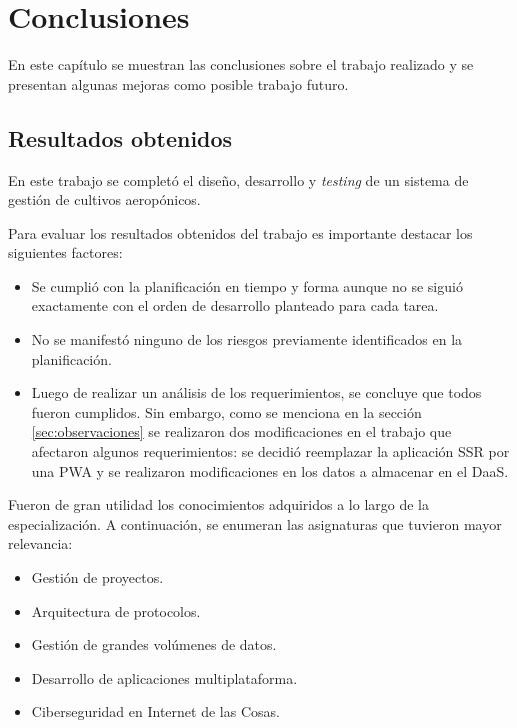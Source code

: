 
\chapter{Conclusiones} %

\label{Chapter5} %

En este capítulo se muestran las conclusiones sobre el trabajo realizado y se presentan algunas mejoras como posible trabajo futuro.



\section{Resultados obtenidos}

En este trabajo se completó el diseño, desarrollo y \textit{testing} de un sistema de gestión de cultivos aeropónicos.

Para evaluar los resultados obtenidos del trabajo es importante destacar los siguientes factores:
\begin{itemize}
	\item Se cumplió con la planificación en tiempo y forma aunque no se siguió exactamente con el orden de desarrollo planteado para cada tarea.
	\item No se manifestó ninguno de los riesgos previamente identificados en la planificación.
	\item Luego de realizar un análisis de los requerimientos, se concluye que todos fueron cumplidos. Sin embargo, como se menciona en la sección \ref{sec:observaciones} se realizaron dos modificaciones en el trabajo que afectaron algunos requerimientos: se decidió reemplazar la aplicación SSR por una PWA y se realizaron modificaciones en los datos a almacenar en el DaaS.
\end{itemize}

Fueron de gran utilidad los conocimientos adquiridos a lo largo de la especialización. A continuación, se enumeran las asignaturas que tuvieron mayor relevancia:
\begin{itemize}
	\item Gestión de proyectos.
	\item Arquitectura de protocolos.
	\item Gestión de grandes volúmenes de datos.
	\item Desarrollo de aplicaciones multiplataforma.
	\item Ciberseguridad en Internet de las Cosas.
\end{itemize}

